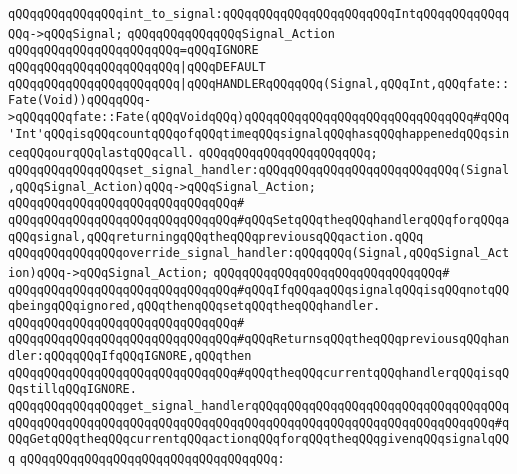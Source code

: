 \verb|qQQqqQQqqQQqqQQqint_to_signal:qQQqqQQqqQQqqQQqqQQqqQQqIntqQQqqQQqqQQqqQQq->qQQqSignal;|\newline
\newline
\verb|qQQqqQQqqQQqqQQqSignal_Action|\newline
\verb|qQQqqQQqqQQqqQQqqQQqqQQq=qQQqIGNORE|\newline
\verb|qQQqqQQqqQQqqQQqqQQqqQQq|\verb#|qQQqDEFAULT#\newline
\verb|qQQqqQQqqQQqqQQqqQQqqQQq|\verb#|qQQqHANDLERqQQqqQQq(Signal,qQQqInt,qQQqfate::Fate(Void))qQQqqQQq->qQQqqQQqfate::Fate(qQQqVoidqQQq)qQQqqQQqqQQqqQQqqQQqqQQqqQQqqQQq#\verb|#qQQq'Int'qQQqisqQQqcountqQQqofqQQqtimeqQQqsignalqQQqhasqQQqhappenedqQQqsinceqQQqourqQQqlastqQQqcall.|\newline
\verb|qQQqqQQqqQQqqQQqqQQqqQQq;|\newline
\newline
\verb|qQQqqQQqqQQqqQQqset_signal_handler:qQQqqQQqqQQqqQQqqQQqqQQqqQQq(Signal,qQQqSignal_Action)qQQq->qQQqSignal_Action;|\newline
\verb|qQQqqQQqqQQqqQQqqQQqqQQqqQQqqQQq#|\newline
\verb|qQQqqQQqqQQqqQQqqQQqqQQqqQQqqQQq#qQQqSetqQQqtheqQQqhandlerqQQqforqQQqaqQQqsignal,qQQqreturningqQQqtheqQQqpreviousqQQqaction.qQQq|\newline
\newline
\verb|qQQqqQQqqQQqqQQqoverride_signal_handler:qQQqqQQq(Signal,qQQqSignal_Action)qQQq->qQQqSignal_Action;|\newline
\verb|qQQqqQQqqQQqqQQqqQQqqQQqqQQqqQQq#|\newline
\verb|qQQqqQQqqQQqqQQqqQQqqQQqqQQqqQQq#qQQqIfqQQqaqQQqsignalqQQqisqQQqnotqQQqbeingqQQqignored,qQQqthenqQQqsetqQQqtheqQQqhandler.|\newline
\verb|qQQqqQQqqQQqqQQqqQQqqQQqqQQqqQQq#|\newline
\verb|qQQqqQQqqQQqqQQqqQQqqQQqqQQqqQQq#qQQqReturnsqQQqtheqQQqpreviousqQQqhandler:qQQqqQQqIfqQQqIGNORE,qQQqthen|\newline
\verb|qQQqqQQqqQQqqQQqqQQqqQQqqQQqqQQq#qQQqtheqQQqcurrentqQQqhandlerqQQqisqQQqstillqQQqIGNORE.|\newline
\newline
\verb|qQQqqQQqqQQqqQQqget_signal_handlerqQQqqQQqqQQqqQQqqQQqqQQqqQQqqQQqqQQqqQQqqQQqqQQqqQQqqQQqqQQqqQQqqQQqqQQqqQQqqQQqqQQqqQQqqQQqqQQqqQQqqQQq#qQQqGetqQQqtheqQQqcurrentqQQqactionqQQqforqQQqtheqQQqgivenqQQqsignalqQQq|\newline
\verb|qQQqqQQqqQQqqQQqqQQqqQQqqQQqqQQqqQQq:|\newline
